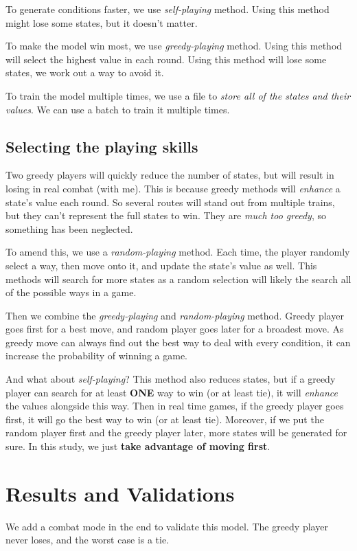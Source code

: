 \documentclass{article}
\begin{document}
To generate conditions faster, we use \textit{self-playing} method. Using this method might lose some states, but it doesn't matter.

To make the model win most, we use \textit{greedy-playing} method. Using this method will select the highest value in each round. Using this method will lose some states, we work out a way to avoid it.

To train the model multiple times, we use a file to \textit{store all of the states and their values}. We can use a batch to train it multiple times.

\subsection{Selecting the playing skills}
Two greedy players will quickly reduce the number of states, but will result in losing in real combat (with me). This is because greedy methods will \textit{enhance} a state's value each round. So several routes will stand out from multiple trains, but they can't represent the full states to win. They are \textit{much too greedy}, so something has been neglected.

To amend this, we use a \textit{random-playing} method. Each time, the player randomly select a way, then move onto it, and update the state's value as well. This methods will search for more states as a random selection will likely the search all of the possible ways in a game.

Then we combine the \textit{greedy-playing} and \textit{random-playing} method. Greedy player goes first for a best move, and random player goes later for a broadest move. As greedy move can always find out the best way to deal with every condition, it can increase the probability of winning a game.

And what about \textit{self-playing}? This method also reduces states, but if a greedy player can search for at least \textbf{ONE} way to win (or at least tie), it will \textit{enhance} the values alongside this way. Then in real time games, if the greedy player goes first, it will go the best way to win (or at least tie). Moreover, if we put the random player first and the greedy player later, more states will be generated for sure. In this study, we just \textbf{take advantage of moving first}.

\section{Results and Validations}
We add a combat mode in the end to validate this model. The greedy player never loses, and the worst case is a tie.
\end{document}
